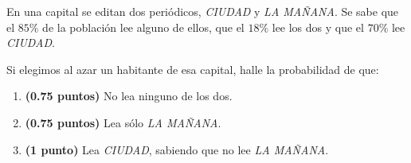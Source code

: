 
En una capital se editan dos periódicos, \textit{CIUDAD} y \textit{LA MAÑANA}. Se sabe que el $85\%$ de la población lee alguno de ellos, que el $18\%$ lee los dos y que el $70\%$ lee \textit{CIUDAD}.

Si elegimos al azar un habitante de esa capital, halle la probabilidad de que:
\begin{enumerate}[label=\alph*)]
\item \textbf{(0.75 puntos)} No lea ninguno de los dos.
\item \textbf{(0.75 puntos)} Lea sólo \textit{LA MAÑANA}.
\item \textbf{(1 punto)} Lea \textit{CIUDAD}, sabiendo que no lee \textit{LA MAÑANA}.
\end{enumerate}
